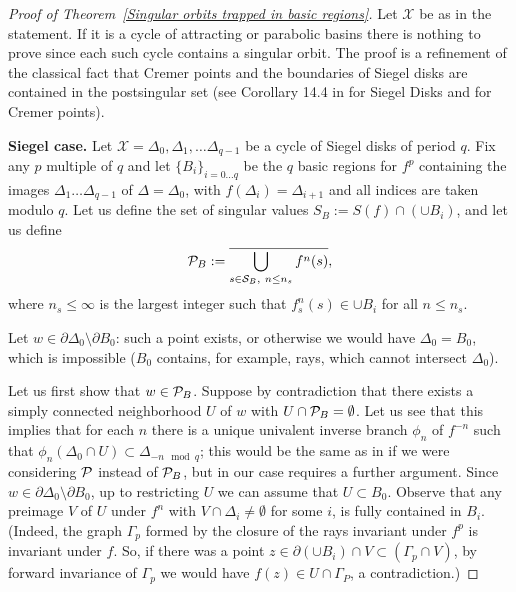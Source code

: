 \documentclass[11pt, twoside]{article}
\theoremstyle{definition}
\newcommand{\C}{\mathbb{C}}
\newcommand{\ov}{\overline}
\newcommand{\PP}{{\cal P}}
\renewcommand{\SS}{{\cal S}}
\newcommand{\De}{\Delta}
\newcommand{\dDe}{\partial\Delta}
\begin{document}
  \begin{proof}[Proof of Theorem~\ref{Singular orbits trapped in basic regions}]
 Let $\mathcal{X}$ be as in the statement. If it is a cycle of attracting or parabolic basins there is nothing to prove since each such cycle  contains a singular orbit. 
 The proof is  a refinement of the classical fact that Cremer points and the boundaries of Siegel disks are contained in the postsingular set (see    Corollary 14.4 in \cite[Corollary 14.4]{Mi} for Siegel Disks and  \cite[Theorem 9.3.4]{Bea} for Cremer points). 
 
{\bf Siegel  case.} 
Let $\mathcal{X}=\Delta_0,\Delta_1,\ldots \Delta_{q-1}$ be a cycle of Siegel disks of period $q$. Fix any $p$ multiple of $q$ and let  $\{B_i\}_{i=0\ldots q}$ be the  $q$ basic regions for $f^p$ containing the images $\Delta_1\ldots \Delta_{q-1}$ of $\Delta=\De_0$, with $f(\Delta_i)=\De_{i+1}$ and all indices are taken modulo $q$. 
Let us define the  set of singular values $S_B:=S(f)\cap (\cup B_i)$, and let us define  
  \[\PP_B:=\ov{\bigcup_{ s\in\SS_B,\ n\leq n_s} f^n(s)},\] 
where $n_s\leq \infty$ is the largest integer such that $f^n_s(s)\in \cup B_i$ for all $n\leq n_s$. 

Let $w\in \dDe_0\setminus \partial B_0$: such a point exists, or otherwise we would have $\De_0=B_0$, which is impossible ($B_0$ contains, for example, rays, which cannot intersect $\Delta_0$).  
 
 
 Let us first  show that $w\in \PP_B$. Suppose by contradiction that there exists a simply connected neighborhood   $U$ of $w$ with $U\cap\PP_B=\emptyset$. Let us see that this implies that  for each $n$ there is a unique univalent  inverse branch  $\phi_n$ of $f^{-n}$ such that 
$\phi_n(\De_0\cap U)\subset \De_{-n\mod q}$; this would be the same as in \cite{Mi} if we were considering $\PP$ instead of $\PP_B$,  but in our case requires a further argument. Since $w\in \dDe_0\setminus \partial B_0$,  up to restricting $U$ we can assume that  $U\subset B_0$. Observe that any  preimage $V$ of $U$ under  $f^n$ with  $V\cap\De_i\neq\emptyset$ for some $i$, is fully contained in $B_i$. (Indeed, the graph $\Gamma_p$ formed by the closure of the rays invariant under $f^p$ is invariant under $f$.
 So, if  there was a point $z\in \partial( \cup B_i)\cap V\subset( \Gamma_p\cap V)$,   by forward  invariance of  $\Gamma_p$ we would have     $f(z)\in U\cap \Gamma_P$, a contradiction.)
 

\end{proof}
\end{document}
